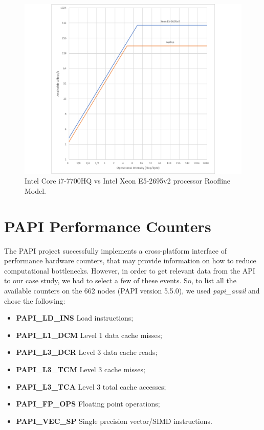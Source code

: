 \documentclass[twoside,twocolumn]{article}
\begin{document}
\begin{figure}[H]
    \includegraphics[width=\columnwidth]{roofline_comparison.png}
    \centering
    \caption{Intel Core i7-7700HQ vs Intel Xeon E5-2695v2 processor Roofline Model.}
    \label{fig:comparison}
\end{figure}

\section{PAPI Performance Counters}

The PAPI project successfully implements a cross-platform interface of performance hardware counters, that may provide information on how to reduce computational bottlenecks. However, in order to get relevant data from the API to our case study, we had to select a few of these events. So, to list all the available counters on the 662 nodes (PAPI version 5.5.0), we used \emph{papi\_avail} and chose the following:

\begin{itemize}
    \item \textbf{PAPI\_LD\_INS} Load instructions;
    \item \textbf{PAPI\_L1\_DCM} Level 1 data cache misses;
    \item \textbf{PAPI\_L3\_DCR} Level 3 data cache reads;
    \item \textbf{PAPI\_L3\_TCM} Level 3 cache misses;
    \item \textbf{PAPI\_L3\_TCA} Level 3 total cache accesses;
    \item \textbf{PAPI\_FP\_OPS} Floating point operations;
    \item \textbf{PAPI\_VEC\_SP} Single precision vector/SIMD instructions.
\end{itemize}
\end{document}
